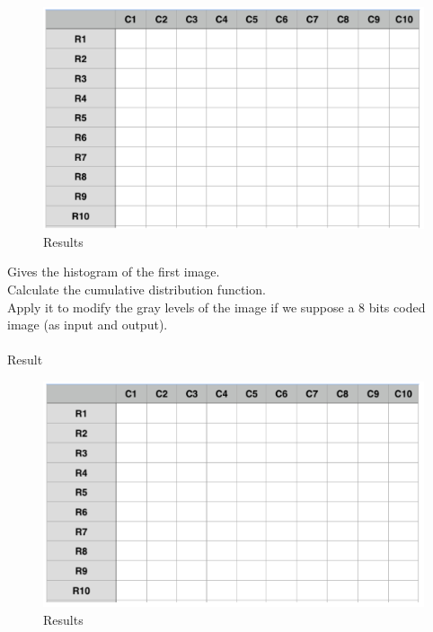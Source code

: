 \documentclass[12pt]{tdtp}
\begin{document}
\begin{figure}[h!]
	\begin{center}
		\includegraphics[scale=0.5]{images/I5.png}
		\caption{Results}
	\end{center}
\end{figure}

\newpage
\Exo

Gives the histogram of the first image.\\
Calculate the cumulative distribution function.\\
Apply it to modify the gray levels of the image if we suppose a 8 bits coded image (as input and output).\\
\\

Result


\begin{figure}[h!]
	\begin{center}
		\includegraphics[scale=0.5]{images/I6.png}
		\caption{Results}
	\end{center}
\end{figure}
\end{document}
